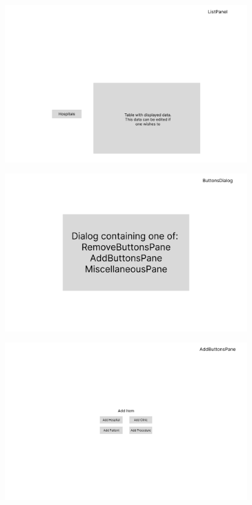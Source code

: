 \documentclass{article}
\begin{document}
\begin{figure}
  \begin{center}
    \includegraphics[width=0.95\textwidth]{./figures/Interface_designs/ListPanel.png}
  \end{center}
\end{figure}

\begin{figure}
  \begin{center}
    \includegraphics[width=0.95\textwidth]{./figures/Interface_designs/ButtonsDialog.png}
  \end{center}
\end{figure}

\begin{figure}
  \begin{center}
    \includegraphics[width=0.95\textwidth]{./figures/Interface_designs/AddButtonsPanel.png}
  \end{center}
\end{figure}
\end{document}
